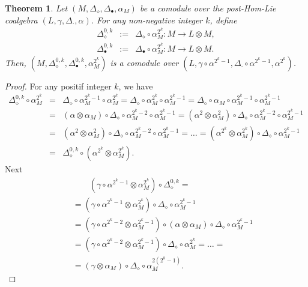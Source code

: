 \documentclass{article}
\newtheorem{thm}{Theorem}[section]
\theoremstyle{definition}
\theoremstyle{remark}
\numberwithin{equation}{section}
\begin{document}
\begin{thm}
 Let $(M, \Delta_\diamond, \Delta_\bullet, \alpha_M)$ be a comodule over the post-Hom-Lie coalgebra $(L, \gamma, \Delta_\cdot, \alpha)$. For any non-negative integer $k$,
 define
\begin{eqnarray}
 \Delta^{0, k}_\diamond&:=&\Delta_\diamond\circ\alpha_M^{2^k} :  M\rightarrow L\otimes M,\label{ms3}\\
\Delta^{0, k}_\bullet&:=&\Delta_\bullet\circ\alpha_M^{2^k} :  M\rightarrow L\otimes M.\label{ms4}
\end{eqnarray}
Then, $(M, \Delta^{0,k}_\diamond, \Delta^{0,k}_\bullet, \alpha_M^{2^k})$ is a comodule over 
$(L, \gamma\circ\alpha^{2^k-1}, \Delta_\cdot\circ\alpha^{2^k-1}, \alpha^{2^k})$.
\end{thm}
\begin{proof}
For any positif integer $k$, we have
 \begin{eqnarray}
  \Delta^{0,k}_\diamond\circ\alpha_M^{2^k}
&=&\Delta_\diamond\circ\alpha_M^{2^k-1}\circ\alpha_M^{2^k}
=\Delta_\diamond\circ\alpha_M^{2^k}\circ\alpha_M^{2^k-1}
=\Delta_\diamond\circ\alpha_M\circ\alpha_M^{2^k-1}\circ\alpha_M^{2^k-1}\nonumber\\
&=&(\alpha\otimes\alpha_M)\circ\Delta_\diamond\circ\alpha_M^{2^k-2}\circ\alpha_M^{2^k-1}
=(\alpha^2\otimes\alpha^2_M)\circ\Delta_\diamond\circ\alpha_M^{2^k-2}\circ\alpha_M^{2^k-1}\nonumber\\
&=&(\alpha^2\otimes\alpha_M^2)\circ\Delta_\diamond\circ\alpha_M^{2^k-2}\circ\alpha_M^{2^k-1}
=\dots=(\alpha^{2^k}\otimes\alpha_M^{2^k})\circ\Delta_\diamond\circ\alpha_M^{2^k-1}\nonumber\\
&=&\Delta^{0, k}_\diamond\circ(\alpha^{2^k}\otimes\alpha_M^{2^k}).\nonumber
 \end{eqnarray}
Next
\begin{eqnarray}
 &&\qquad(\gamma\circ\alpha^{2^k-1}\otimes\alpha_M^{2^k})\circ\Delta^{0, k}_\diamond=\nonumber\\
&&=(\gamma\circ\alpha^{2^k-1}\otimes\alpha_M^{2^k})\circ\Delta_\diamond\circ\alpha_M^{2^k-1}\nonumber\\
&&=(\gamma\circ\alpha^{2^k-2}\otimes\alpha_M^{2^k-1})\circ(\alpha\otimes\alpha_M)\circ\Delta_\diamond\circ\alpha_M^{2^k-1}\nonumber\\
&&=(\gamma\circ\alpha^{2^k-2}\otimes\alpha_M^{2^k-1})\circ\Delta_\diamond\circ\alpha_M^{2^k}=\dots=\nonumber\\
&&=(\gamma\otimes\alpha_M)\circ\Delta_\diamond\circ\alpha_M^{2(2^k-1)}\nonumber.
\end{eqnarray}

\end{proof}
\end{document}
